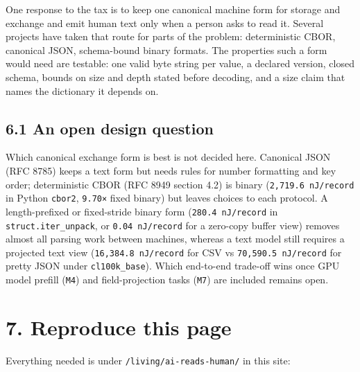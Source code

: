 \documentclass[10pt,letterpaper]{article}
\begin{document}
One response to the tax is to keep one canonical machine form for
storage and exchange and emit human text only when a person asks to read
it. Several projects have taken that route for parts of the problem:
deterministic CBOR, canonical JSON, schema-bound binary formats. The
properties such a form would need are testable: one valid byte string
per value, a declared version, closed schema, bounds on size and depth
stated before decoding, and a size claim that names the dictionary it
depends on.

\subsection{6.1 An open design question}\label{an-open-design-question}

Which canonical exchange form is best is not decided here. Canonical
JSON (RFC 8785) keeps a text form but needs rules for number formatting
and key order; deterministic CBOR (RFC 8949 section 4.2) is binary
(\texttt{2,\allowbreak{}719.\allowbreak{}6\ nJ/\allowbreak{}record} in Python \texttt{cbor2}, \texttt{9.70×}
fixed binary) but leaves choices to each protocol. A length-prefixed or
fixed-stride binary form (\texttt{280.\allowbreak{}4\ nJ/\allowbreak{}record} in
\texttt{struct.\allowbreak{}iter\_\allowbreak{}unpack}, or \texttt{0.04\ nJ/record} for a
zero-copy buffer view) removes almost all parsing work between machines,
whereas a text model still requires a projected text view
(\texttt{16,\allowbreak{}384.\allowbreak{}8\ nJ/\allowbreak{}record} for CSV vs \texttt{70,\allowbreak{}590.\allowbreak{}5\ nJ/\allowbreak{}record}
for pretty JSON under \texttt{cl100k\_base}). Which end-to-end trade-off
wins once GPU model prefill (\texttt{M4}) and field-projection tasks
(\texttt{M7}) are included remains open.

\section{7. Reproduce this page}\label{reproduce-this-page}

Everything needed is under \texttt{/\allowbreak{}living/\allowbreak{}ai-\allowbreak{}reads-\allowbreak{}human/\allowbreak{}} in this
site:
\end{document}
